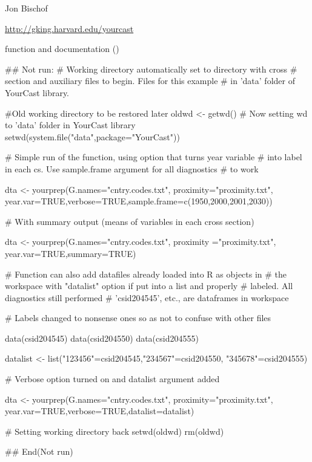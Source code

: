 %
\begin{Author}\relax
Jon Bischof 
\end{Author}
%
\begin{References}\relax
\url{http://gking.harvard.edu/yourcast}
\end{References}
%
\begin{SeeAlso}\relax
{} function and documentation
()
\end{SeeAlso}
%
\begin{Examples}
\begin{ExampleCode}
## Not run: 
# Working directory automatically set to directory with cross
# section and auxiliary files to begin. Files for this example
# in 'data' folder of YourCast library.

#Old working directory to be restored later
oldwd <- getwd()
# Now setting wd to 'data' folder in YourCast library
setwd(system.file("data",package="YourCast"))

# Simple run of the function, using option that turns year variable
# into label in each cs. Use sample.frame argument for all diagnostics
# to work
 
dta <- yourprep(G.names="cntry.codes.txt", proximity="proximity.txt",
year.var=TRUE,verbose=TRUE,sample.frame=c(1950,2000,2001,2030))


# With summary output (means of variables in each cross section) 


dta <- yourprep(G.names="cntry.codes.txt", proximity ="proximity.txt",
year.var=TRUE,summary=TRUE)


# Function can also add datafiles already loaded into R as objects in
# the workspace with "datalist" option if put into a list and properly
# labeled. All diagnostics still performed 
# 'csid204545', etc., are dataframes in workspace

# Labels changed to nonsense ones so as not to confuse with other files

data(csid204545)
data(csid204550)
data(csid204555)

datalist <- list("123456"=csid204545,"234567"=csid204550,
"345678"=csid204555) 

# Verbose option turned on and datalist argument added 

dta <- yourprep(G.names="cntry.codes.txt", proximity="proximity.txt",
year.var=TRUE,verbose=TRUE,datalist=datalist)

# Setting working directory back
setwd(oldwd)
rm(oldwd)

## End(Not run)
\end{ExampleCode}
\end{Examples}
